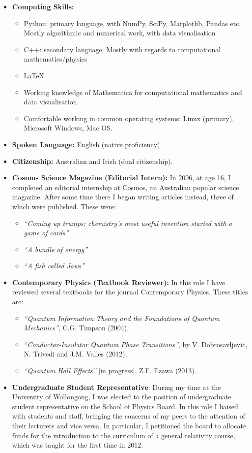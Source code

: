 \documentclass[11pt,a4paper,sans]{moderncv}        %
\begin{document}
\small{\begin{itemize}
\item \textbf{Computing Skills:}
\begin{itemize}
\item Python: primary language, with NumPy, SciPy, Matplotlib, Pandas etc. Mostly algorithmic and numerical work, with data visualisation 
\item C++: secondary language. Mostly with regards to computational mathematics/physics
\item \LaTeX
\item Working knowledge of Mathematica for computational mathematics and data visualisation.
\item Comfortable working in common operating systems: Linux (primary), Microsoft Windows, Mac OS.
\end{itemize}
\item \textbf{Spoken Language:} English (native proficiency).
\item \textbf{Citizenship:} Australian and Irish (dual citizenship).
\item \textbf{Cosmos Science Magazine (Editorial Intern):} In 2006, at age 16, I completed an editorial internship at Cosmos, an Australian popular science magazine. After some time there I began writing articles instead, three of which were published. These were:
\begin{itemize}
\item \textit{``Coming up trumps; chemistry's most useful invention started with a game of cards''}
\item \textit{``A bundle of energy''}
\item \textit{``A fish called Jaws''}
\end{itemize}
\item \textbf{Contemporary Physics (Textbook Reviewer):} In this role I have reviewed several textbooks for the journal Contemporary Physics. These titles are:
\begin{itemize}
\item \textit{``Quantum Information Theory and the Foundations of Quantum Mechanics''}, C.G.  Timpson (2004).
\item \textit{``Conductor-Insulator Quantum Phase Transitions''}, by V. Dobrosavljevic, N. Trivedi and J.M. Valles (2012).
\item \textit{``Quantum Hall Effects''} [in progress], Z.F. Ezawa (2013).
\end{itemize}
\item{\textbf{Undergraduate Student Representative}: During my time at the University of Wollongong, I was elected to the position of undergraduate student representative on the School of Physics Board. In this role I liaised with students and staff, bringing the concerns of my peers to the attention of their lecturers and vice versa. In particular, I petitioned the board to allocate funds for the introduction to the curriculum of a general relativity course, which was taught for the first time in 2012.}

\end{itemize}}
\end{document}
